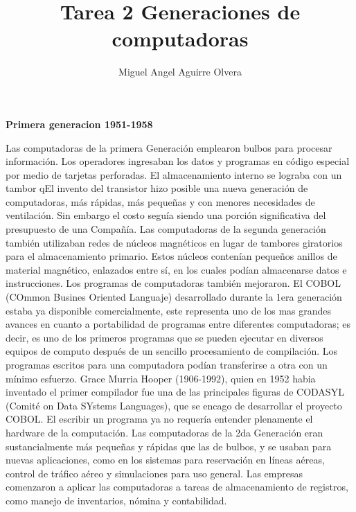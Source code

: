 \documentclass[10pt,a4paper]{article}
\author{Miguel Angel Aguirre Olvera}
\title{Tarea 2 Generaciones de computadoras}
\begin{document}
\maketitle

\begin{multicols}{2}
\begin{center}
\textbf{Primera generacion 1951-1958}
\end{center}
Las computadoras de la primera Generación emplearon bulbos para procesar información. Los operadores ingresaban los datos y programas en código especial por medio de tarjetas perforadas. El almacenamiento interno se lograba con un tambor qEl invento del transistor hizo posible una nueva generación de computadoras, más rápidas, más pequeñas y con menores necesidades de ventilación. Sin embargo el costo seguía siendo una porción significativa del presupuesto de una Compañía. Las computadoras de la segunda generación también utilizaban redes de núcleos magnéticos en lugar de tambores giratorios para el almacenamiento primario. Estos núcleos contenían pequeños anillos de material magnético, enlazados entre sí, en los cuales podían almacenarse datos e instrucciones.
Los programas de computadoras también mejoraron. El COBOL (COmmon Busines Oriented Languaje) desarrollado durante la 1era generación estaba ya disponible comercialmente, este representa uno de los mas grandes avances en cuanto a portabilidad de programas entre diferentes computadoras; es decir, es uno de los primeros programas que se pueden ejecutar en diversos equipos de computo después de un sencillo procesamiento de compilación. Los programas escritos para una computadora podían transferirse a otra con un mínimo esfuerzo. Grace Murria Hooper (1906-1992), quien en 1952 habia inventado el primer compilador fue una de las principales figuras de CODASYL (Comité on Data SYstems Languages), que se encago de desarrollar el proyecto COBOL. El escribir un programa ya no requería entender plenamente el hardware de la computación. Las computadoras de la 2da Generación eran sustancialmente más pequeñas y rápidas que las de bulbos, y se usaban para nuevas aplicaciones, como en los sistemas para reservación en líneas aéreas, control de tráfico aéreo y simulaciones para uso general. Las empresas comenzaron a aplicar las computadoras a tareas de almacenamiento de registros, como manejo de inventarios, nómina y contabilidad.
 

\end{multicols}
\end{document}
